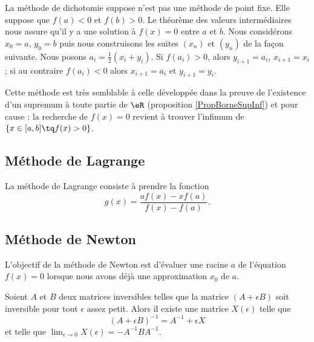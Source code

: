 La méthode de dichotomie suppose n'est pas une méthode de point fixe. Elle suppose que \( f(a)<0\) et \( f(b)>0\). Le théorème des valeurs intermédiaires nous assure qu'il y a une solution à \( f(x)=0\) entre \( a\) et \( b\). Nous considérons \( x_0=a\), \( y_0=b\) puis nous construisons les suites \( (x_n)\) et \( (y_n)\) de la façon suivante. Nous posons \( a_i=\frac{ 1 }{2}(x_i+y_i)\). Si \( f(a_i)>0\), alors \( y_{i+1}=a_i\), \( x_{i+1}=x_i\); si au contraire \( f(a_i)<0\) alors \( x_{i+1}=a_i\) et \( y_{i+1}=y_i\).

Cette méthode est très semblable à celle développée dans la preuve de l'existence d'un supremum à toute partie de \( \eR\) (proposition \ref{PropBorneSupInf}) et pour cause : la recherche de \( f(x)=0\) revient à trouver l'infimum de \( \{ x\in\mathopen[ a , b \mathclose]\tq f(x)>0 \}\).

\subsection{Méthode de Lagrange}

La méthode de Lagrange consiste à prendre la fonction
\begin{equation}
    g(x)=\frac{ af(x)-xf(a) }{ f(x)-f(a) }.
\end{equation}

\subsection{Méthode de Newton}

L'objectif de la méthode de Newton est d'évaluer une racine \( a\) de l'équation \( f(x)=0\) lorsque nous avons déjà une approximation \( x_0\) de \( a\).

\begin{lemma}       \label{LemXdObnV}
    Soient \( A\) et \( B\) deux matrices inversibles telles que la matrice \( (A+\epsilon B)\) soit inversible pour tout \( \epsilon\) assez petit. Alors il existe une matrice \( X(\epsilon)\) telle que
    \begin{equation}
        (A+\epsilon B)^{-1}=A^{-1}+\epsilon X
    \end{equation}
    et telle que \( \lim_{\epsilon\to 0}X(\epsilon)=-A^{-1} BA^{-1}\).
\end{lemma}

